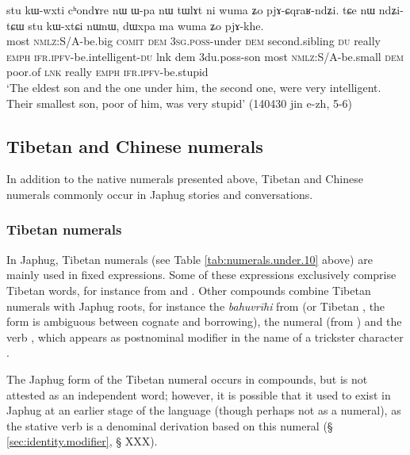 \begin{exe}
\ex  \label{ex:Wpa.nW}
\gll stu kɯ-wxti cʰondɤre nɯ ɯ-pa nɯ tɯlɤt ni wuma ʑo pjɤ-ɕqraʁ-ndʑi. tɕe nɯ ndʑi-tɕɯ stu kɯ-xtɕi nɯnɯ, dɯxpa ma wuma ʑo pjɤ-khe. \\
most \textsc{nmlz}:S/A-be.big \textsc{comit} \textsc{dem} \textsc{3sg}.\textsc{poss}-under \textsc{dem} second.sibling \textsc{du} really \textsc{emph} \textsc{ifr}.\textsc{ipfv}-be.intelligent-\textsc{du} lnk dem 3du.poss-son most \textsc{nmlz}:S/A-be.small \textsc{dem} poor.of \textsc{lnk} really \textsc{emph} \textsc{ifr}.\textsc{ipfv}-be.stupid \\
\glt `The eldest son and the one under him, the second one, were very intelligent. Their smallest son, poor of him, was very stupid' (140430 jin e-zh, 5-6) 
\end{exe}
 
 \subsection{Tibetan and Chinese numerals}  
 In addition to the native numerals presented above, Tibetan and Chinese numerals commonly occur in Japhug stories and conversations.

 \subsubsection{Tibetan numerals} \label{sec:tibetan.numerals}

In Japhug, Tibetan numerals (see Table \ref{tab:numerals.under.10} above) are mainly used in fixed expressions. Some of these expressions exclusively comprise Tibetan words, for instance  from  and .  Other compounds combine Tibetan numerals with Japhug roots, for instance the \textit{bahuvrīhi}   from  (or Tibetan , the form is ambiguous between cognate and borrowing), the numeral  (from  ) and the verb , which appears as postnominal modifier in the name of a trickster character .
 
 The Japhug form  of the Tibetan numeral   occurs in compounds, but is not attested as an independent word; however, it is possible that  it used to exist in Japhug at an earlier stage of the language (though perhaps not as a numeral), as the stative verb  is a denominal derivation based on this numeral (§ \ref{sec:identity.modifier}, § XXX). 

